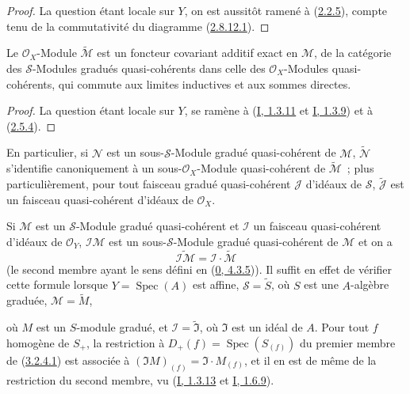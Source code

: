 \begin{proof}
La question étant locale sur $Y$, on est aussitôt ramené à
(\hyperref[II.2.2.5-fr]{2.2.5}), compte tenu de la commutativité du diagramme
(\hyperref[II.2.8.12.1-fr]{2.8.12.1}).
\end{proof}

\begin{proposition}[3.2.4]
\label{II.3.2.4-fr}
Le $\mathcal{O}_X$-Module $\widetilde{\mathcal{M}}$ est un foncteur covariant
additif exact en $\mathcal{M}$, de la catégorie des $\mathcal{S}$-Modules
gradués quasi-cohérents dans celle des $\mathcal{O}_X$-Modules
quasi-cohérents, qui commute aux limites inductives et aux sommes directes.
\end{proposition}

\begin{proof}
La question étant locale sur $Y$, se ramène à
(\hyperref[I.1.3.11-fr]{I, 1.3.11} et
\hyperref[I.1.3.9-fr]{I, 1.3.9}) et à
(\hyperref[II.2.5.4-fr]{2.5.4}).
\end{proof}

En particulier, si $\mathcal{N}$ est un sous-$\mathcal{S}$-Module gradué
quasi-cohérent de $\mathcal{M}$, $\widetilde{\mathcal{N}}$ s'identifie
canoniquement à un sous-$\mathcal{O}_X$-Module quasi-cohérent de
$\widetilde{\mathcal{M}}$~; plus particulièrement, pour tout faisceau gradué
quasi-cohérent $\mathcal{J}$ d'idéaux de $\mathcal{S}$,
$\widetilde{\mathcal{J}}$ est un faisceau quasi-cohérent d'idéaux de
$\mathcal{O}_X$.

Si $\mathcal{M}$ est un $\mathcal{S}$-Module gradué quasi-cohérent et
$\mathcal{I}$ un faisceau quasi-cohérent d'idéaux de $\mathcal{O}_Y$,
$\mathcal{I}\mathcal{M}$ est un sous-$\mathcal{S}$-Module gradué
quasi-cohérent de $\mathcal{M}$ et on a
\[
\label{II.3.2.4.1-fr}
  \widetilde{\mathcal{I}\mathcal{M}}
  =\mathcal{I}\cdot\widetilde{\mathcal{M}}
\tag{3.2.4.1}
\]
(le second membre ayant le sens défini en
(\hyperref[0.4.3.5-fr]{0, 4.3.5})). Il suffit en effet de vérifier cette
formule lorsque $Y=\operatorname{Spec}(A)$ est affine,
$\mathcal{S}=\widetilde{S}$, où $S$ est une $A$-algèbre graduée,
$\mathcal{M}=\widetilde{M}$,


où $M$ est un $S$-module gradué, et
$\mathcal{I}=\widetilde{\mathfrak{I}}$, où $\mathfrak{I}$ est un idéal de
$A$. Pour tout $f$ homogène de $S_+$, la restriction à
$D_+(f)=\operatorname{Spec}(S_{(f)})$ du premier membre de
(\hyperref[II.3.2.4.1-fr]{3.2.4.1}) est associée à
$(\mathfrak{I}M)_{(f)}=\mathfrak{I}\cdot M_{(f)}$, et il en est de même de la
restriction du second membre, vu
(\hyperref[I.1.3.13-fr]{I, 1.3.13} et
\hyperref[I.1.6.9-fr]{I, 1.6.9}).

